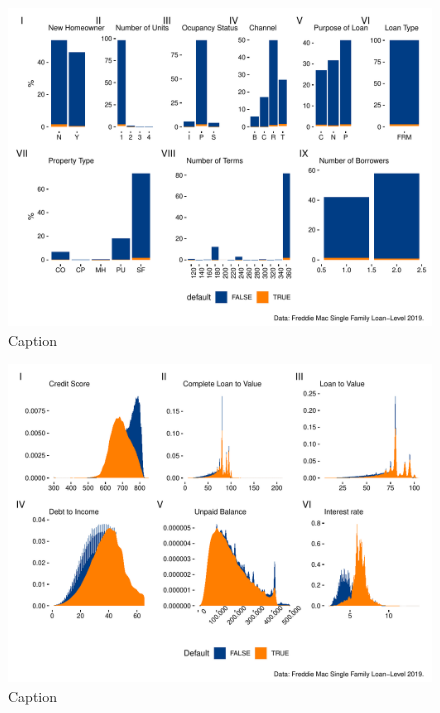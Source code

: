 \begin{figure}
    \centering
    \includegraphics[width = \textwidth]{Figures/pw_4.pdf}
    \caption{Caption}
    \label{fig:my_label}
\end{figure}

\begin{figure}
    \centering
    \includegraphics[width = \textwidth]{Figures/pw_5.pdf}
    \caption{Caption}
    \label{fig:my_label}
\end{figure}

